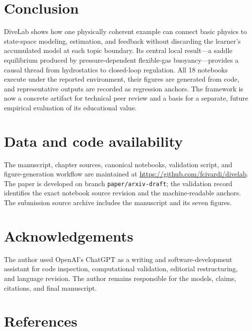 \documentclass[
]{article}
\begin{document}
\hypertarget{conclusion}{%
\section{Conclusion}\label{conclusion}}

DiveLab shows how one physically coherent example can connect basic
physics to state-space modeling, estimation, and feedback without
discarding the learner's accumulated model at each topic boundary. Its
central local result---a saddle equilibrium produced by
pressure-dependent flexible-gas buoyancy---provides a causal thread from
hydrostatics to closed-loop regulation. All 18 notebooks execute under
the reported environment, their figures are generated from code, and
representative outputs are recorded as regression anchors. The framework
is now a concrete artifact for technical peer review and a basis for a
separate, future empirical evaluation of its educational value.

\hypertarget{data-and-code-availability}{%
\section*{Data and code availability}\label{data-and-code-availability}}

The manuscript, chapter sources, canonical notebooks, validation script,
and figure-generation workflow are maintained at
\url{https://github.com/fcivardi/divelab}. The paper is developed on
branch \texttt{paper/arxiv-draft}; the validation record identifies the
exact notebook source revision and the machine-readable anchors. The
submission source archive includes the manuscript and its seven figures.

\hypertarget{acknowledgements}{%
\section*{Acknowledgements}\label{acknowledgements}}

The author used OpenAI's ChatGPT as a writing and software-development
assistant for code inspection, computational validation, editorial
restructuring, and language revision. The author remains responsible for
the models, claims, citations, and final manuscript.

\hypertarget{references}{%
\section*{References}\label{references}}
\end{document}
